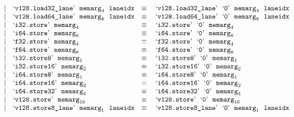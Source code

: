 $$\begin{array}[t]{@{}lrrl@{}l@{}l@{}l@{}}
& & | & \mbox{‘\texttt{v128.load32\_lane}’}~~{{\mathtt{memarg}}}_{4}~~{\mathtt{laneidx}} & \quad\equiv\quad{} & \mbox{‘\texttt{v128.load32\_lane}’}~~\mbox{‘\texttt{0}’}~~{{\mathtt{memarg}}}_{4}~~{\mathtt{laneidx}} \\
& & | & \mbox{‘\texttt{v128.load64\_lane}’}~~{{\mathtt{memarg}}}_{8}~~{\mathtt{laneidx}} & \quad\equiv\quad{} & \mbox{‘\texttt{v128.load64\_lane}’}~~\mbox{‘\texttt{0}’}~~{{\mathtt{memarg}}}_{8}~~{\mathtt{laneidx}} \\
& & | & \mbox{‘\texttt{i32.store}’}~~{{\mathtt{memarg}}}_{4} & \quad\equiv\quad{} & \mbox{‘\texttt{i32.store}’}~~\mbox{‘\texttt{0}’}~~{{\mathtt{memarg}}}_{4} \\
& & | & \mbox{‘\texttt{i64.store}’}~~{{\mathtt{memarg}}}_{8} & \quad\equiv\quad{} & \mbox{‘\texttt{i64.store}’}~~\mbox{‘\texttt{0}’}~~{{\mathtt{memarg}}}_{8} \\
& & | & \mbox{‘\texttt{f32.store}’}~~{{\mathtt{memarg}}}_{4} & \quad\equiv\quad{} & \mbox{‘\texttt{f32.store}’}~~\mbox{‘\texttt{0}’}~~{{\mathtt{memarg}}}_{4} \\
& & | & \mbox{‘\texttt{f64.store}’}~~{{\mathtt{memarg}}}_{8} & \quad\equiv\quad{} & \mbox{‘\texttt{f64.store}’}~~\mbox{‘\texttt{0}’}~~{{\mathtt{memarg}}}_{8} \\
& & | & \mbox{‘\texttt{i32.store8}’}~~{{\mathtt{memarg}}}_{1} & \quad\equiv\quad{} & \mbox{‘\texttt{i32.store8}’}~~\mbox{‘\texttt{0}’}~~{{\mathtt{memarg}}}_{1} \\
& & | & \mbox{‘\texttt{i32.store16}’}~~{{\mathtt{memarg}}}_{2} & \quad\equiv\quad{} & \mbox{‘\texttt{i32.store16}’}~~\mbox{‘\texttt{0}’}~~{{\mathtt{memarg}}}_{2} \\
& & | & \mbox{‘\texttt{i64.store8}’}~~{{\mathtt{memarg}}}_{1} & \quad\equiv\quad{} & \mbox{‘\texttt{i64.store8}’}~~\mbox{‘\texttt{0}’}~~{{\mathtt{memarg}}}_{1} \\
& & | & \mbox{‘\texttt{i64.store16}’}~~{{\mathtt{memarg}}}_{2} & \quad\equiv\quad{} & \mbox{‘\texttt{i64.store16}’}~~\mbox{‘\texttt{0}’}~~{{\mathtt{memarg}}}_{2} \\
& & | & \mbox{‘\texttt{i64.store32}’}~~{{\mathtt{memarg}}}_{4} & \quad\equiv\quad{} & \mbox{‘\texttt{i64.store32}’}~~\mbox{‘\texttt{0}’}~~{{\mathtt{memarg}}}_{4} \\
& & | & \mbox{‘\texttt{v128.store}’}~~{{\mathtt{memarg}}}_{16} & \quad\equiv\quad{} & \mbox{‘\texttt{v128.store}’}~~\mbox{‘\texttt{0}’}~~{{\mathtt{memarg}}}_{16} \\
& & | & \mbox{‘\texttt{v128.store8\_lane}’}~~{{\mathtt{memarg}}}_{1}~~{\mathtt{laneidx}} & \quad\equiv\quad{} & \mbox{‘\texttt{v128.store8\_lane}’}~~\mbox{‘\texttt{0}’}~~{{\mathtt{memarg}}}_{1}~~{\mathtt{laneidx}} \\

\end{array}$$
